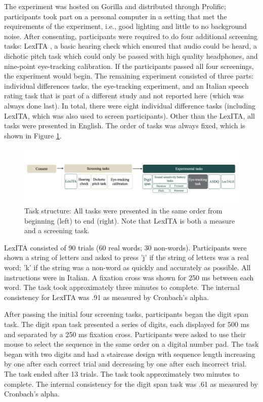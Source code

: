 The experiment was hosted on Gorilla and distributed through Prolific; participants took part on a personal computer in a setting that met the requirements of the experiment, i.e., good lighting and little to no background noise. After consenting, participants were required to do four additional screening tasks: LexITA \cite{Amenta2021}, a basic hearing check which ensured that audio could be heard, a dichotic pitch task \citep{milne_2021} which could only be passed with high quality headphones, and nine-point eye-tracking calibration. If the participants passed all four screenings, the experiment would begin. The remaining experiment consisted of three parts: individual differences tasks, the eye-tracking experiment, and an Italian speech rating task that is part of a different study and not reported here (which was always done last). In total, there were eight individual difference tasks (including LexITA, which was also used to screen participants). Other than the LexITA, all tasks were presented in English. The order of tasks was always fixed, which is shown in Figure \ref{fig:task_structure}. 

\begin{figure}[H]
  \centering
  \includegraphics[width=1\linewidth]{visuals/task_structure.jpg}
  \caption{Task structure: All tasks were presented in the same order from beginning (left) to end (right). Note that LexITA is both a measure and a screening task.}
  \label{fig:task_structure}
\end{figure}

LexITA \citep{Amenta2021} consisted of 90 trials (60 real words; 30 non-words). Participants were shown a string of letters and asked to press 'j' if the string of letters was a real word; 'k' if the string was a non-word as quickly and accurately as possible. All instructions were in Italian. A fixation cross was shown for 250 ms between each word. The task took approximately three minutes to complete. The internal consistency for LexITA was .91 as measured by Cronbach's alpha.

After passing the initial four screening tasks, participants began the digit span task. The digit span task presented a series of digits, each displayed for 500 ms and separated by a 250 ms fixation cross. Participants were asked to use their mouse to select the sequence in the same order on a digital number pad. The task began with two digits and had a staircase design with sequence length increasing by one after each correct trial and decreasing by one after each incorrect trial. The task ended after 13 trials. The task took approximately two minutes to complete. The internal consistency for the digit span task was .61 as measured by Cronbach's alpha.

